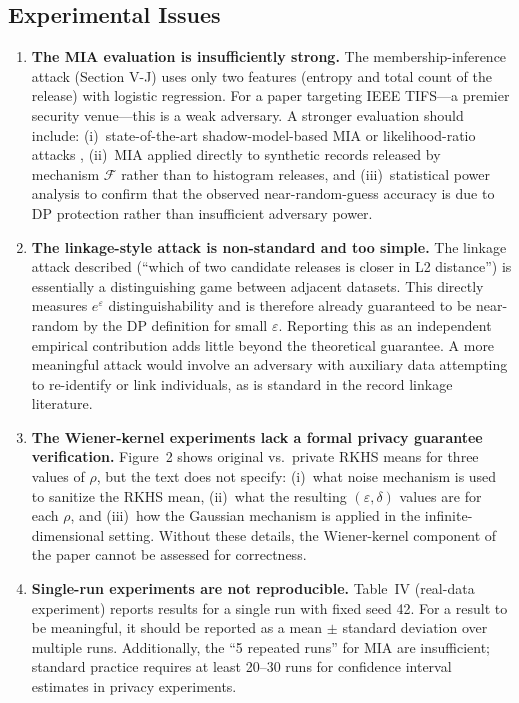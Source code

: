 \documentclass[12pt]{article}
\begin{document}
\subsection{Experimental Issues}

\begin{enumerate}[label=\textbf{M\arabic*.}, resume, leftmargin=*, wide=0pt]

\item \textbf{The MIA evaluation is insufficiently strong.}
The membership-inference attack (Section V-J) uses only two features (entropy and total count of the release) with logistic regression. For a paper targeting IEEE TIFS---a premier security venue---this is a weak adversary. A stronger evaluation should include: (i)~state-of-the-art shadow-model-based MIA \cite{shokri2017membership} or likelihood-ratio attacks \cite{carlini2022membership}, (ii)~MIA applied directly to synthetic records released by mechanism $\mathcal{F}$ rather than to histogram releases, and (iii)~statistical power analysis to confirm that the observed near-random-guess accuracy is due to DP protection rather than insufficient adversary power.

\item \textbf{The linkage-style attack is non-standard and too simple.}
The linkage attack described (``which of two candidate releases is closer in L2 distance'') is essentially a distinguishing game between adjacent datasets. This directly measures $e^\varepsilon$ distinguishability and is therefore already guaranteed to be near-random by the DP definition for small $\varepsilon$. Reporting this as an independent empirical contribution adds little beyond the theoretical guarantee. A more meaningful attack would involve an adversary with auxiliary data attempting to re-identify or link individuals, as is standard in the record linkage literature.

\item \textbf{The Wiener-kernel experiments lack a formal privacy guarantee verification.}
Figure~2 shows original vs.\ private RKHS means for three values of $\rho$, but the text does not specify: (i)~what noise mechanism is used to sanitize the RKHS mean, (ii)~what the resulting $(\varepsilon, \delta)$ values are for each $\rho$, and (iii)~how the Gaussian mechanism is applied in the infinite-dimensional setting. Without these details, the Wiener-kernel component of the paper cannot be assessed for correctness.

\item \textbf{Single-run experiments are not reproducible.}
Table~IV (real-data experiment) reports results for a single run with fixed seed 42. For a result to be meaningful, it should be reported as a mean $\pm$ standard deviation over multiple runs. Additionally, the ``5 repeated runs'' for MIA are insufficient; standard practice requires at least 20--30 runs for confidence interval estimates in privacy experiments.


\end{enumerate}
\end{document}
